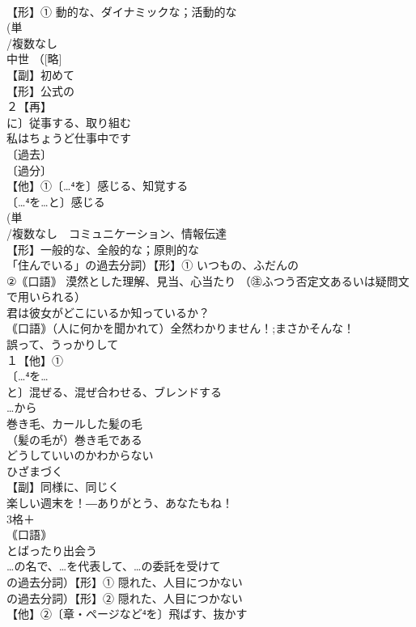 \documentclass[8pt]{extreport}
\begin{document}
\begin{CJK}{UTF8}{min}
\\	【形】① 動的な、ダイナミックな；活動的な 
\\	(単
\\	/複数なし 
\\	中世 （[略]
\\	【副】初めて
\\	【形】公式の 
\\	２【再】
\\	に〕従事する、取り組む 
\\	私はちょうど仕事中です
\\	〔過去〕
\\	〔過分〕
\\	【他】①〔…⁴を〕感じる、知覚する　
\\	〔…⁴を…と〕感じる
\\	(単
\\	/複数なし　コミュニケーション、情報伝達 
\\	【形】一般的な、全般的な；原則的な
\\	「住んでいる」の過去分詞）【形】① いつもの、ふだんの 
\\	②｟口語｠ 漠然とした理解、見当、心当たり （㊟ふつう否定文あるいは疑問文で用いられる） 
\\	君は彼女がどこにいるか知っているか？ 
\\	｟口語｠（人に何かを聞かれて）全然わかりません！;まさかそんな！
\\	誤って、うっかりして
\\	１【他】①
\\	〔…⁴を…
\\	と〕混ぜる、混ぜ合わせる、ブレンドする 
\\	…から
\\	巻き毛、カールした髪の毛 
\\	（髪の毛が）巻き毛である
\\	どうしていいのかわからない
\\	ひざまづく
\\	【副】同様に、同じく 
\\	楽しい週末を！―ありがとう、あなたもね！
\\	3格＋
\\	｟口語｠ 
\\	とばったり出会う
\\	…の名で、…を代表して、…の委託を受けて
\\	の過去分詞）【形】① 隠れた、人目につかない 
\\	の過去分詞）【形】② 隠れた、人目につかない 
\\	【他】②〔章・ページなど⁴を〕飛ばす、抜かす 

\end{CJK}
\end{document}
